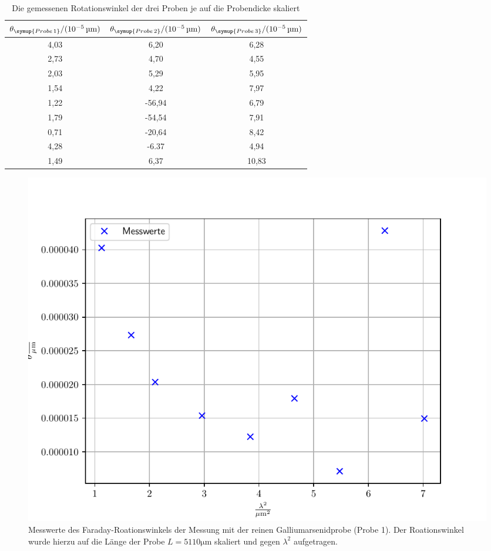\FloatBarrier
\begin{table}[h]
    \centering
    \caption{Die gemessenen Rotationswinkel der drei Proben je auf die Probendicke skaliert}
    \label{tab:atab4}
    \begin{tabular}{c c c}
        \toprule
        {$\theta_{\symup{Probe\,1}}/(10^{-5}\,\si{\micro\meter})$} & {$\theta_{\symup{Probe\,2}}/(10^{-5}\,\si{\micro\meter})$} & {$\theta_{\symup{Probe\,3}}/(10^{-5}\,\si{\micro\meter})$}\\
        \midrule
        4,03  & 6,20   &  6,28 \\
        2,73  & 4,70   &  4,55 \\
        2,03  & 5,29   &  5,95 \\
        1,54  & 4,22   &  7,97 \\
        1,22  & -56,94 &  6,79 \\
        1,79  & -54,54 &  7,91 \\
        0,71  & -20,64 &  8,42 \\
        4,28  & -6.37  &  4,94 \\
        1,49  & 6,37   &  10,83 \\
        \bottomrule 
    \end{tabular}
\end{table}
\FloatBarrier
\noindent
\FloatBarrier
\begin{figure}[h]
    \centering
    \includegraphics[width=1\textwidth]{Winkel_undotiert.pdf}
    \caption{Messwerte des Faraday-Roationswinkels der Messung mit der reinen Galliumarsenidprobe (Probe 1). Der Roationswinkel wurde hierzu auf die Länge der Probe $L = 5110 \si{\micro\meter}$ skaliert und gegen $\lambda ^2$ aufgetragen.}
    \label{fig:afig2}
\end{figure}
\FloatBarrier
\noindent

